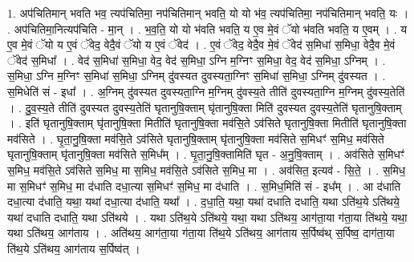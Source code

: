 \documentclass[17pt]{extarticle}
\begin{document}
1. अप॑चितिमान् भवति भव॒ त्यप॑चितिमा॒ नप॑चितिमान् भवति॒ यो यो भ॑व॒ त्यप॑चितिमा॒ नप॑चितिमान् भवति॒ यः । . अप॑चितिमा॒नित्यप॑चिति - मा॒न् । . भ॒व॒ति॒ यो यो भ॑वति भवति॒ य ए॒व मे॒वं ॅयो भ॑वति भवति॒ य ए॒वम् । . य ए॒व मे॒वं ॅयो य ए॒वं ॅवेद॒ वेदै॒वं ॅयो य ए॒वं ॅवेद॑ । . ए॒वं ॅवेद॒ वेदै॒व मे॒वं ॅवेद॑ स॒मिधा॑ स॒मिधा॒ वेदै॒व मे॒वं ॅवेद॑ स॒मिधा᳚ । . वेद॑ स॒मिधा॑ स॒मिधा॒ वेद॒ वेद॑ स॒मिधा॒ ऽग्नि म॒ग्निꣳ स॒मिधा॒ वेद॒ वेद॑ स॒मिधा॒ ऽग्निम् । . स॒मिधा॒ ऽग्नि म॒ग्निꣳ स॒मिधा॑ स॒मिधा॒ ऽग्निम् दु॑वस्यत दुवस्यता॒ग्निꣳ स॒मिधा॑ स॒मिधा॒ ऽग्निम् दु॑वस्यत । . स॒मिधेति॑ सं - इधा᳚ । . अ॒ग्निम् दु॑वस्यत दुवस्यता॒ग्नि म॒ग्निम् दु॑वस्य॒ते तीति॑ दुवस्यता॒ग्नि म॒ग्निम् दु॑वस्य॒तेति॑ । . दु॒व॒स्य॒ते तीति॑ दुवस्यत दुवस्य॒तेति॑ घृतानुषि॒क्ताम् घृ॑तानुषि॒क्ता मिति॑ दुवस्यत दुवस्य॒तेति॑ घृतानुषि॒क्ताम् । . इति॑ घृतानुषि॒क्ताम् घृ॑तानुषि॒क्ता मितीति॑ घृतानुषि॒क्ता मव॑सि॒ते ऽव॑सिते घृतानुषि॒क्ता मितीति॑ घृतानुषि॒क्ता मव॑सिते । . घृ॒ता॒नु॒षि॒क्ता मव॑सि॒ते ऽव॑सिते घृतानुषि॒क्ताम् घृ॑तानुषि॒क्ता मव॑सिते स॒मिधꣳ॑ स॒मिध॒ मव॑सिते घृतानुषि॒क्ताम् घृ॑तानुषि॒क्ता मव॑सिते स॒मिध᳚म् । . घृ॒ता॒नु॒षि॒क्तामिति॑ घृत - अ॒नु॒षि॒क्ताम् । . अव॑सिते स॒मिधꣳ॑ स॒मिध॒ मव॑सि॒ते ऽव॑सिते स॒मिध॒ मा स॒मिध॒ मव॑सि॒ते ऽव॑सिते स॒मिध॒ मा । . अव॑सित॒ इत्यव॑ - सि॒ते॒ । . स॒मिध॒ मा स॒मिधꣳ॑ स॒मिध॒ मा द॑धाति दधा॒त्या स॒मिधꣳ॑ स॒मिध॒ मा द॑धाति । . स॒मिध॒मिति॑ सं - इध᳚म् । . आ द॑धाति दधा॒त्या द॑धाति॒ यथा॒ यथा॑ दधा॒त्या द॑धाति॒ यथा᳚ । . द॒धा॒ति॒ यथा॒ यथा॑ दधाति दधाति॒ यथा ऽति॑थ॒ये ऽति॑थये॒ यथा॑ दधाति दधाति॒ यथा ऽति॑थये । . यथा ऽति॑थ॒ये ऽति॑थये॒ यथा॒ यथा ऽति॑थय॒ आग॑ता॒या ग॑ता॒या ति॑थये॒ यथा॒ यथा ऽति॑थय॒ आग॑ताय । . अति॑थय॒ आग॑ता॒या ग॑ता॒या ति॑थ॒ये ऽति॑थय॒ आग॑ताय स॒र्पिष्व॑थ् स॒र्पिष्व॒ दाग॑ता॒या ति॑थ॒ये ऽति॑थय॒ आग॑ताय स॒र्पिष्व॑त् । \newline
\end{document}
